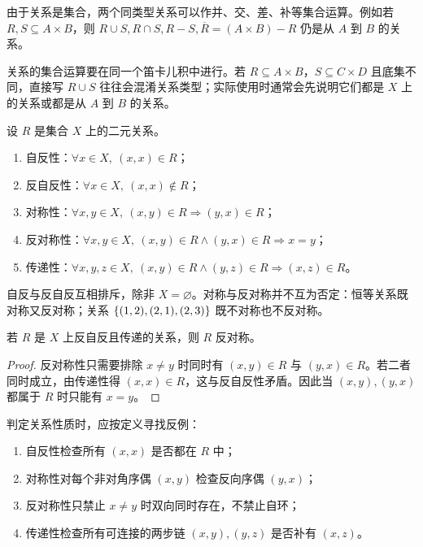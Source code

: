 由于关系是集合，两个同类型关系可以作并、交、差、补等集合运算。例如若 $R,S\subseteq A\times B$，则 $R\cup S,R\cap S,R-S,\overline R=(A\times B)-R$ 仍是从 $A$ 到 $B$ 的关系。

关系的集合运算要在同一个笛卡儿积中进行。若 $R\subseteq A\times B$，$S\subseteq C\times D$ 且底集不同，直接写 $R\cup S$ 往往会混淆关系类型；实际使用时通常会先说明它们都是 $X$ 上的关系或都是从 $A$ 到 $B$ 的关系。

\begin{definition}[集合上关系的五种性质]\label{ch2-relation-properties}
设 $R$ 是集合 $X$ 上的二元关系。
\begin{enumerate}
  \item 自反性：$\forall x\in X,\ (x,x)\in R$；
  \item 反自反性：$\forall x\in X,\ (x,x)\notin R$；
  \item 对称性：$\forall x,y\in X,\ (x,y)\in R\Rightarrow (y,x)\in R$；
  \item 反对称性：$\forall x,y\in X,\ (x,y)\in R\land(y,x)\in R\Rightarrow x=y$；
  \item 传递性：$\forall x,y,z\in X,\ (x,y)\in R\land(y,z)\in R\Rightarrow (x,z)\in R$。
\end{enumerate}
\end{definition}

自反与反自反互相排斥，除非 $X=\varnothing$。对称与反对称并不互为否定：恒等关系既对称又反对称；关系 $\{(1,2),(2,1),(2,3)\}$ 既不对称也不反对称。

\begin{theorem}[反自反且传递推出反对称]\label{ch2-irref-trans-antisym}
若 $R$ 是 $X$ 上反自反且传递的关系，则 $R$ 反对称。
\end{theorem}

\begin{proof}
反对称性只需要排除 $x\ne y$ 时同时有 $(x,y)\in R$ 与 $(y,x)\in R$。若二者同时成立，由传递性得 $(x,x)\in R$，这与反自反性矛盾。因此当 $(x,y),(y,x)$ 都属于 $R$ 时只能有 $x=y$。
\end{proof}

\begin{method}[关系性质的判定入口]\label{ch2-property-method}
判定关系性质时，应按定义寻找反例：
\begin{enumerate}
  \item 自反性检查所有 $(x,x)$ 是否都在 $R$ 中；
  \item 对称性对每个非对角序偶 $(x,y)$ 检查反向序偶 $(y,x)$；
  \item 反对称性只禁止 $x\ne y$ 时双向同时存在，不禁止自环；
  \item 传递性检查所有可连接的两步链 $(x,y),(y,z)$ 是否补有 $(x,z)$。
\end{enumerate}
\end{method}

